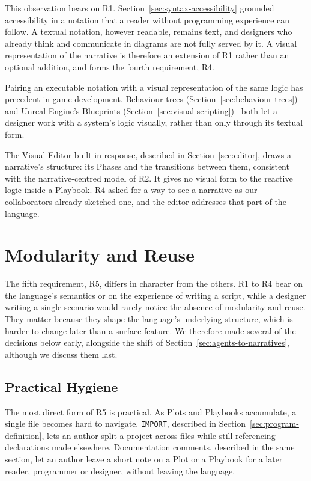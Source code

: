 This observation bears on R1. Section~\ref{sec:syntax-accessibility} grounded accessibility in a notation that a reader without programming experience can follow. A textual notation, however readable, remains text, and designers who already think and communicate in diagrams are not fully served by it. A visual representation of the narrative is therefore an extension of R1 rather than an optional addition, and forms the fourth requirement, R4.
 
Pairing an executable notation with a visual representation of the same logic has precedent in game development. Behaviour trees (Section~\ref{sec:behaviour-trees})~\cite{Iovino2022} and Unreal Engine's Blueprints (Section~\ref{sec:visual-scripting})~\cite{Yannakakis2025} both let a designer work with a system's logic visually, rather than only through its textual form.
 
The Visual Editor built in response, described in Section~\ref{sec:editor}, draws a narrative's structure: its Phases and the transitions between them, consistent with the narrative-centred model of R2. It gives no visual form to the reactive logic inside a Playbook. R4 asked for a way to see a narrative as our collaborators already sketched one, and the editor addresses that part of the language.
  
\section{Modularity and Reuse}
\label{sec:modularity-reuse}
The fifth requirement, R5, differs in character from the others. R1 to R4 bear on the language's semantics or on the experience of writing a script, while a designer writing a single scenario would rarely notice the absence of modularity and reuse. They matter because they shape the language's underlying structure, which is harder to change later than a surface feature. We therefore made several of the decisions below early, alongside the shift of Section~\ref{sec:agents-to-narratives}, although we discuss them last.
 
\subsection{Practical Hygiene}
The most direct form of R5 is practical. As Plots and Playbooks accumulate, a single file becomes hard to navigate. \lstinline|IMPORT|, described in Section~\ref{sec:program-definition}, lets an author split a project across files while still referencing declarations made elsewhere. Documentation comments, described in the same section, let an author leave a short note on a Plot or a Playbook for a later reader, programmer or designer, without leaving the language.
 
